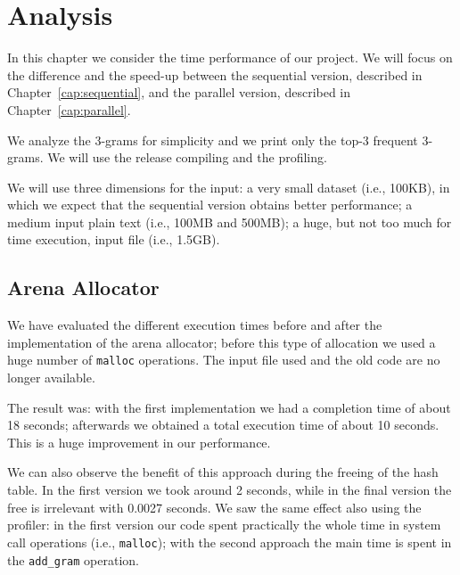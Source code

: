 \chapter{Analysis}
\label{cap:analysis}
In this chapter we consider the time performance of our project. We will focus on the difference and the speed-up between the sequential version, described in Chapter~\ref{cap:sequential}, and the parallel version, described in Chapter~\ref{cap:parallel}.

We analyze the 3-grams for simplicity and we print only the top-3 frequent 3-grams. We will use the release compiling and the profiling.

We will use three dimensions for the input: a very small dataset (i.e., 100KB), in which we expect that the sequential version obtains better performance; a medium input plain text (i.e., 100MB and 500MB); a huge, but not too much for time execution, input file (i.e., 1.5GB).

\section{Arena Allocator}
We have evaluated the different execution times before and after the implementation of the arena allocator; before this type of allocation we used a huge number of \texttt{malloc} operations. The input file used and the old code are no longer available.

The result was: with the first implementation we had a completion time of about 18 seconds; afterwards we obtained a total execution time of about 10 seconds. This is a huge improvement in our performance.

We can also observe the benefit of this approach during the freeing of the hash table. In the first version we took around 2 seconds, while in the final version the free is irrelevant with 0.0027 seconds. We saw the same effect also using the profiler: in the first version our code spent practically the whole time in system call operations (i.e., \texttt{malloc}); with the second approach the main time is spent in the \texttt{add\_gram} operation.

